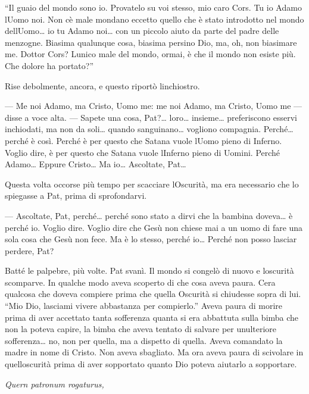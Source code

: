 ``Il guaio del mondo sono io. Provatelo su voi stesso, mio caro Cors. Tu
io Adamo l\textquotesingle Uomo noi. Non c\textquotesingle è male
mondano eccetto quello che è stato introdotto nel mondo
dell\textquotesingle Uomo\ldots{} io tu Adamo noi\ldots{} con un piccolo
aiuto da parte del padre delle menzogne. Biasima qualunque cosa, biasima
persino Dio, ma, oh, non biasimare me. Dottor Cors?
L\textquotesingle unico male del mondo, ormai, è che il mondo non esiste
più. Che dolore ha portato?''

Rise debolmente, ancora, e questo riportò l\textquotesingle inchiostro.

--- Me noi Adamo, ma Cristo, Uomo me: me noi Adamo, ma Cristo, Uomo me
--- disse a voce alta. --- Sapete una cosa, Pat?\ldots{} loro\ldots{}
insieme\ldots{} preferiscono esservi inchiodati, ma non da soli\ldots{}
quando sanguinano\ldots{} vogliono compagnia. Perché\ldots{} perché è
così. Perché è per questo che Satana vuole l\textquotesingle Uomo pieno
di Inferno. Voglio dire, è per questo che Satana vuole
l\textquotesingle Inferno pieno di Uomini. Perché Adamo\ldots{} Eppure
Cristo\ldots{} Ma io\ldots{} Ascoltate, Pat\ldots{}

Questa volta occorse più tempo per scacciare l\textquotesingle Oscurità,
ma era necessario che lo spiegasse a Pat, prima di sprofondarvi.

--- Ascoltate, Pat, perché\ldots{} perché sono stato a dirvi che la
bambina doveva\ldots{} è perché io. Voglio dire. Voglio dire che Gesù
non chiese mai a un uomo di fare una sola cosa che Gesù non fece. Ma è
lo stesso, perché io\ldots{} Perché non posso lasciar perdere, Pat?

Batté le palpebre, più volte. Pat svanì. Il mondo si congelò di nuovo e
l\textquotesingle oscurità scomparve. In qualche modo aveva scoperto di
che cosa aveva paura. C\textquotesingle era qualcosa che doveva compiere
prima che quella Oscurità si chiudesse sopra di lui. ``Mio Dio, lasciami
vivere abbastanza per compierlo.'' Aveva paura di morire prima di aver
accettato tanta sofferenza quanta si era abbattuta sulla bimba che non
la poteva capire, la bimba che aveva tentato di salvare per
un\textquotesingle ulteriore sofferenza\ldots{} no, non per quella, ma a
dispetto di quella. Aveva comandato la madre in nome di Cristo. Non
aveva sbagliato. Ma ora aveva paura di scivolare in
quell\textquotesingle oscurità prima di aver sopportato quanto Dio
poteva aiutarlo a sopportare.

\emph{Quern patronum rogaturus,}

